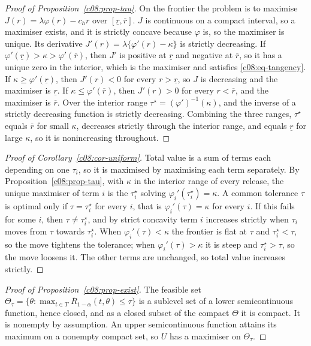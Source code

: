 \begin{proof}[Proof of Proposition~\ref{c08:prop-tau}]
On the frontier the problem is to maximise $J(r) = \lambda\varphi(r) - c_h r$ over
$[\underline{r}, \overline{r}]$. $J$ is continuous on a compact interval, so a
maximiser exists, and it is strictly concave because $\varphi$ is, so the
maximiser is unique. Its derivative $J'(r) = \lambda\{\varphi'(r) - \kappa\}$ is
strictly decreasing. If $\varphi'(\underline{r}) > \kappa > \varphi'(\overline{r})$,
then $J'$ is positive at $\underline{r}$ and negative at $\overline{r}$, so it has a
unique zero in the interior, which is the maximiser and satisfies
\eqref{c08:eq-tangency}. If $\kappa \ge \varphi'(\underline{r})$, then $J'(r) < 0$
for every $r > \underline{r}$, so $J$ is decreasing and the maximiser is
$\underline{r}$. If $\kappa \le \varphi'(\overline{r})$, then $J'(r) > 0$ for every
$r < \overline{r}$, and the maximiser is $\overline{r}$. Over the interior range
$\tau^\star = (\varphi')^{-1}(\kappa)$, and the inverse of a strictly decreasing
function is strictly decreasing. Combining the three ranges, $\tau^\star$ equals
$\overline{r}$ for small $\kappa$, decreases strictly through the interior range,
and equals $\underline{r}$ for large $\kappa$, so it is nonincreasing throughout.
\end{proof}

\begin{proof}[Proof of Corollary~\ref{c08:cor-uniform}]
Total value is a sum of terms each depending on one $\tau_i$, so it is maximised by
maximising each term separately. By Proposition~\ref{c08:prop-tau}, with $\kappa$ in
the interior range of every release, the unique maximiser of term $i$ is the
$\tau_i^\star$ solving $\varphi_i'(\tau_i^\star) = \kappa$. A common tolerance $\tau$
is optimal only if $\tau = \tau_i^\star$ for every $i$, that is
$\varphi_i'(\tau) = \kappa$ for every $i$. If this fails for some $i$, then
$\tau \ne \tau_i^\star$, and by strict concavity term $i$ increases strictly when
$\tau_i$ moves from $\tau$ towards $\tau_i^\star$. When $\varphi_i'(\tau) < \kappa$
the frontier is flat at $\tau$ and $\tau_i^\star < \tau$, so the move tightens the
tolerance; when $\varphi_i'(\tau) > \kappa$ it is steep and $\tau_i^\star > \tau$, so
the move loosens it. The other terms are unchanged, so total value increases
strictly.
\end{proof}

\begin{proof}[Proof of Proposition~\ref{c08:prop-exist}]
The feasible set $\Theta_\tau = \{\theta : \max_{t \in T}
\overline{R}_{1-\alpha}(t,\theta) \le \tau\}$ is a sublevel set of a lower
semicontinuous function, hence closed, and as a closed subset of the compact
$\Theta$ it is compact. It is nonempty by assumption. An upper semicontinuous
function attains its maximum on a nonempty compact set, so $U$ has a maximiser on
$\Theta_\tau$.
\end{proof}

